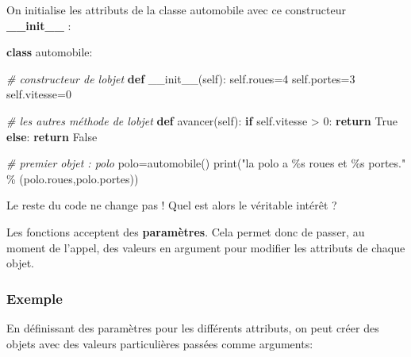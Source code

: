 \documentclass[11pt]{article}
\newenvironment{Shaded}{}{}
\newcommand{\KeywordTok}[1]{\textcolor[rgb]{0.00,0.44,0.13}{\textbf{{#1}}}}
\newcommand{\DecValTok}[1]{\textcolor[rgb]{0.25,0.63,0.44}{{#1}}}
\newcommand{\StringTok}[1]{\textcolor[rgb]{0.25,0.44,0.63}{{#1}}}
\newcommand{\CommentTok}[1]{\textcolor[rgb]{0.38,0.63,0.69}{\textit{{#1}}}}
\newcommand{\FunctionTok}[1]{\textcolor[rgb]{0.02,0.16,0.49}{{#1}}}
\newcommand{\NormalTok}[1]{{#1}}
\newcommand{\SpecialCharTok}[1]{\textcolor[rgb]{0.25,0.44,0.63}{{#1}}}
\newcommand{\VariableTok}[1]{\textcolor[rgb]{0.10,0.09,0.49}{{#1}}}
\newcommand{\ControlFlowTok}[1]{\textcolor[rgb]{0.00,0.44,0.13}{\textbf{{#1}}}}
\newcommand{\OperatorTok}[1]{\textcolor[rgb]{0.40,0.40,0.40}{{#1}}}
\newcommand{\BuiltInTok}[1]{{#1}}
\begin{document}
On initialise les attributs de la classe automobile avec ce constructeur
\textbf{\_\_init\_\_} :

\begin{Shaded}
\begin{Highlighting}[]
\KeywordTok{class}\NormalTok{ automobile:}
    
    \CommentTok{\# constructeur de l\textquotesingle{}objet}
    \KeywordTok{def} \FunctionTok{\_\_init\_\_}\NormalTok{(}\VariableTok{self}\NormalTok{):}
        \VariableTok{self}\NormalTok{.roues}\OperatorTok{=}\DecValTok{4}
        \VariableTok{self}\NormalTok{.portes}\OperatorTok{=}\DecValTok{3}
        \VariableTok{self}\NormalTok{.vitesse}\OperatorTok{=}\DecValTok{0}
    
    \CommentTok{\# les autres méthode de l\textquotesingle{}objet}
    \KeywordTok{def}\NormalTok{ avancer(}\VariableTok{self}\NormalTok{):}
        \ControlFlowTok{if} \VariableTok{self}\NormalTok{.vitesse }\OperatorTok{\textgreater{}} \DecValTok{0}\NormalTok{:}
            \ControlFlowTok{return} \VariableTok{True}
        \ControlFlowTok{else}\NormalTok{:}
            \ControlFlowTok{return} \VariableTok{False}

\CommentTok{\# premier objet : polo}
\NormalTok{polo}\OperatorTok{=}\NormalTok{automobile()}
\BuiltInTok{print}\NormalTok{(}\StringTok{"la polo a }\SpecialCharTok{\%s}\StringTok{ roues et }\SpecialCharTok{\%s}\StringTok{ portes."} \OperatorTok{\%}\NormalTok{ (polo.roues,polo.portes))}
\end{Highlighting}
\end{Shaded}

Le reste du code ne change pas ! Quel est alors le véritable intérêt ?

Les fonctions acceptent des \textbf{paramètres}. Cela permet donc de
passer, au moment de l'appel, des valeurs en argument pour modifier les
attributs de chaque objet.

\hypertarget{exemple-1}{%
\subsubsection*{Exemple}\label{exemple-1}}

En définissant des paramètres pour les différents attributs, on peut
créer des objets avec des valeurs particulières passées comme arguments:
\end{document}
